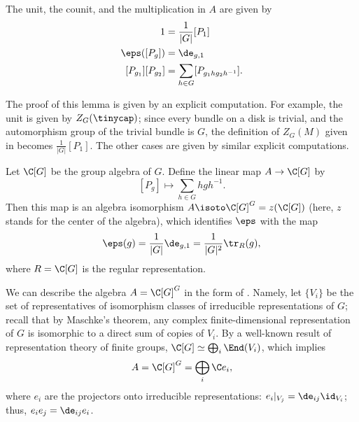 \begin{lemma}\label{l:dw-frobenius-structure}
  The unit, the counit, and the multiplication in $A$ are given by
  \begin{equation}\label{e:dw-frob-structure}
    \begin{aligned}
      1 &= \frac{1}{|G|} [P_1]\\
      \eps([P_g]) &= \de_{g,1}\\
      [P_{g_1}][P_{g_2}]&=\sum_{h\in G} [P_{g_1 hg_2h^{-1}}].
    \end{aligned}
  \end{equation}
\end{lemma}
The proof of this lemma is given by an explicit computation. For example, the
unit is given by $Z_G(\tinycap)$; since every bundle on a disk is trivial, and
the automorphism group of the trivial bundle is $G$, the definition of $Z_G(M)$
given in  becomes $\frac{1}{|G|} [P_1]$. The other cases are given
by similar explicit computations.

\begin{corollary}
  Let $\C[G]$ be the group algebra of $G$.
  Define the linear map $A\to \C[G]$ by
  $$
    [P_g]\mapsto \sum_{h \in G} hgh^{-1}.
  $$
  Then this map is an algebra isomorphism $A\isoto \C[G]^G=z(\C[G])$
  \textup{(}here, $z$ stands for the center of the algebra\textup{)}, which
  identifies $\eps$ with the map
  \begin{equation}\label{e:dw_eps}
    \eps(g) = \frac{1}{|G|}\de_{g, 1}= \frac{1}{|G|^2}\tr_{R}(g),
  \end{equation}
  where $R=\C[G]$ is the regular representation.
\end{corollary}

We can describe the algebra $A=\C[G]^G$ in the form of
. Namely, let $\{V_i\}$ be the set of
representatives of isomorphism classes of irreducible representations of $G$;
recall that by Maschke's theorem, any complex finite-dimensional representation
of $G$ is isomorphic to a direct sum of copies of $V_i$. By a well-known result
of representation theory of finite groups, $\C[G]\simeq \bigoplus_i \End(V_i)$,
which implies
\begin{equation}\label{e:dw_projectors}
  A=\C[G]^G=\bigoplus_i \C e_i,
\end{equation}
where $e_i$ are the projectors onto irreducible representations:
$e_i|_{V_j}=\de_{ij}\id_{V_i}$; thus, $e_i e_j = \de_{ij}e_i$.

